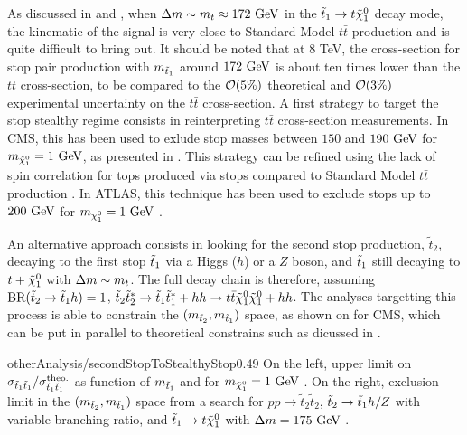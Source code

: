     As discussed in  and ,
    when $\Delta m \sim m_{t} \approx 172~\text{GeV}$ in the $\tilde{t}_1 \rightarrow t \tilde{\chi}_1^0$
    decay mode, the kinematic of the signal is very close to Standard Model $t\bar{t}$ production
    and is quite difficult to bring out. It should be noted that at 8 TeV, the cross-section
    for stop pair production with $m_{\tilde{t}_1}$ around $172~\text{GeV}$ is about ten times lower
    than the $t\bar{t}$ cross-section, to be compared to the $\mathcal{O}(5\%)$ theoretical
    and $\mathcal{O}(3\%)$ experimental uncertainty on the $t\bar{t}$ cross-section. A first
    strategy to target the stop stealthy regime consists in reinterpreting $t\bar{t}$
    cross-section measurements. In CMS, this has been used to exlude stop masses between
    $150$ and $190~\text{GeV}$ for $m_{\tilde{\chi}_1^0} = 1~\text{GeV}$, as presented in 
    \cite{topCrossSectionMeasurement}. This
    strategy can be refined using the lack of spin correlation for tops produced via
    stops compared to Standard Model $t\bar{t}$ production \cite{LightStopSigns}.
    In ATLAS, this technique has been used to exclude stops up to $200~\text{GeV}$ for
    $m_{\tilde{\chi}_1^0} = 1~\text{GeV}$ \cite{ATLASstealthyStops}.

    An alternative approach consists in looking for the second stop production, $\tilde{t}_2$,
    decaying to the first stop $\tilde{t}_1$ via a Higgs ($h$) or a $Z$ boson, and $\tilde{t}_1$ still decaying
    to $t + \tilde{\chi}_1^0$ with $\Delta m \sim m_{t}$. The full decay chain is therefore,
    assuming $\text{BR}(\tilde{t}_2 \rightarrow \tilde{t}_1 h) = 1$,
    $\tilde{t}_2 \tilde{t}^*_2 \rightarrow \tilde{t}_1 \tilde{t}_1^* + hh \rightarrow t\bar{t} \tilde{\chi}_1^0 \tilde{\chi}_1^0 + hh$.
    The analyses \cite{SUS-13-024, ATLASstopSearches} targetting this process is able to
    constrain the $(m_{\tilde{t}_2},m_{\tilde{t}_1})$ space, as shown on
     for CMS, which can be put in parallel to theoretical
    constrains such as dicussed in .

                                {otherAnalysis/secondStopToStealthyStop}{0.49}{
                                On the left, upper limit on $\sigma_{\tilde{t}_1\tilde{t}_1} / \sigma^\text{theo.}_{\tilde{t}_1\tilde{t}_1}$
                                as function of $m_{\tilde{t}_1}$ and for $m_{\tilde{\chi}_1^0} = 1~\text{GeV}$ \cite{topCrossSectionMeasurement}. On the right,
                                exclusion limit in the $(m_{\tilde{t}_2},m_{\tilde{t}_1})$ space from a search for
                                $pp \rightarrow \tilde{t}_2\tilde{t}_2$, $\tilde{t}_2 \rightarrow \tilde{t}_1 h/Z$ with
                                variable branching ratio, and $\tilde{t}_1 \rightarrow t \tilde{\chi}_1^0$ with $\Delta m = 175~\text{GeV}$ \cite{SUS-13-024}.}

